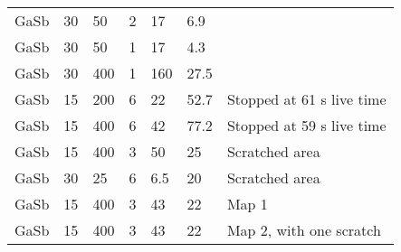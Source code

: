 \begin{table}[phtb]
\begin{center}
\begin{tabular}{llllllp{3.5cm}}
            GaSb            & 30             & 50                             & 2           & 17           & 6.9         &                           \\
            GaSb            & 30             & 50                             & 1           & 17           & 4.3         &                           \\
            GaSb            & 30             & 400                            & 1           & 160          & 27.5        &                           \\
            GaSb            & 15             & 200                            & 6           & 22           & 52.7        & Stopped at 61 s live time \\
            GaSb            & 15             & 400                            & 6           & 42           & 77.2        & Stopped at 59 s live time \\
            GaSb            & 15             & 400                            & 3           & 50           & 25          & Scratched area            \\
            GaSb            & 30             & 25                             & 6           & 6.5          & 20          & Scratched area            \\
            GaSb            & 15             & 400                            & 3           & 43           & 22          & Map 1                     \\
            GaSb            & 15             & 400                            & 3           & 43           & 22          & Map 2, with one scratch   \\
            \hline
        \end{tabular}
    \end{center}
\end{table}
